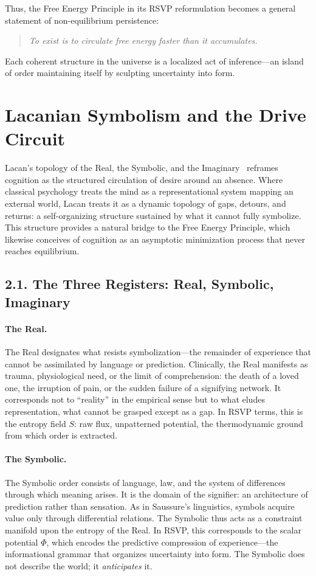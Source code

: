 \documentclass[12pt,a4paper]{article}
\begin{document}
Thus, the Free Energy Principle in its RSVP reformulation becomes a general statement of non-equilibrium persistence:  
\begin{quote}
\textit{To exist is to circulate free energy faster than it accumulates.}
\end{quote}
Each coherent structure in the universe is a localized act of inference—an island of order maintaining itself by sculpting uncertainty into form.


\section{Lacanian Symbolism and the Drive Circuit}

Lacan’s topology of the Real, the Symbolic, and the Imaginary~\citep{lacan1973seminarXI} reframes cognition as the structured circulation of desire around an absence.  
Where classical psychology treats the mind as a representational system mapping an external world, Lacan treats it as a dynamic topology of gaps, detours, and returns: a self-organizing structure sustained by what it cannot fully symbolize.  
This structure provides a natural bridge to the Free Energy Principle, which likewise conceives of cognition as an asymptotic minimization process that never reaches equilibrium.

\subsection{2.1. The Three Registers: Real, Symbolic, Imaginary}

\paragraph{The Real.}
The Real designates what resists symbolization---the remainder of experience that cannot be assimilated by language or prediction.  
Clinically, the Real manifests as trauma, physiological need, or the limit of comprehension: the death of a loved one, the irruption of pain, or the sudden failure of a signifying network.  
It corresponds not to “reality” in the empirical sense but to what eludes representation, what cannot be grasped except as a gap.  
In RSVP terms, this is the entropy field \(S\): raw flux, unpatterned potential, the thermodynamic ground from which order is extracted.

\paragraph{The Symbolic.}
The Symbolic order consists of language, law, and the system of differences through which meaning arises.  
It is the domain of the signifier: an architecture of prediction rather than sensation.  
As in Saussure’s linguistics, symbols acquire value only through differential relations.  
The Symbolic thus acts as a constraint manifold upon the entropy of the Real.  
In RSVP, this corresponds to the scalar potential \(\Phi\), which encodes the predictive compression of experience—the informational grammar that organizes uncertainty into form.  
The Symbolic does not describe the world; it \emph{anticipates} it.
\end{document}
